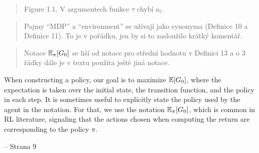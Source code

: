 \documentclass[aspectratio=169]{beamer}
\begin{document}
\begin{frame}
	\begin{quote}
		Figure 1.1. V argumentech funkce $ \tau $ chybí $ a_t $.
	\end{quote}
	\begin{center}
		\vspace{2em}
	\end{center}
\end{frame}

\begin{frame}
	\begin{quote}
		Pojmy “MDP” a “environment” se užívají jako synonyma (Definice 10 a Definice 11). To je v pořádku, jen by si to zasloužilo krátký komentář.
	\end{quote}
\end{frame}

\begin{frame}
	\begin{quote}
		Notace $ \operatorname*{\mathbb{E}}_\pi [G_0] $ se liší od notace pro střední hodnotu v Definici 13 a o 3 řádky dále je v textu použita ještě jiná notace.
	\end{quote}

When constructing a policy, our goal is to maximize $ \operatorname*{\mathbb{E}}\!\left[ G_0 \right] $, where the expectation is taken over the initial state, the transition function, and the policy in each step.
It is sometimes useful to explicitly state the policy used by the agent in the notation.
For that, we use the notation $ \operatorname*{\mathbb{E}}_\pi\!\left[ G_0 \right] $, which is common in RL literature, signaling that the actions chosen when computing the return are corresponding to the policy $ \pi $.

\hfill -- Strana 9

\end{frame}
\end{document}
